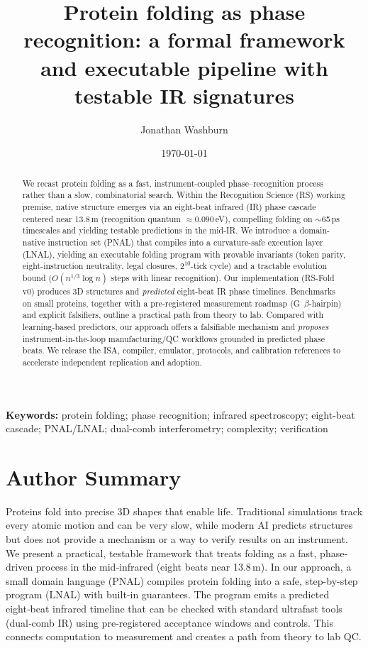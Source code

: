 \documentclass[12pt,a4paper]{article}
\title{Protein folding as phase recognition: a formal framework and executable pipeline with testable IR signatures}
\author[1]{Jonathan Washburn}
\affil[1]{Recognition Science Institute, Austin, Texas, USA}
\date{\today}
\begin{document}
\maketitle

\begin{abstract}
We recast protein folding as a fast, instrument-coupled phase–recognition process rather than a slow, combinatorial search. Within the Recognition Science (RS) working premise, native structure emerges via an eight-beat infrared (IR) phase cascade centered near 13.8\,\textmu m (recognition quantum $\approx 0.090$\,eV), compelling folding on $\sim$65\,ps timescales and yielding testable predictions in the mid-IR. We introduce a domain-native instruction set (PNAL) that compiles into a curvature-safe execution layer (LNAL), yielding an executable folding program with provable invariants (token parity, eight-instruction neutrality, legal closures, $2^{10}$-tick cycle) and a tractable evolution bound ($O(n^{1/3}\log n)$ steps with linear recognition). Our implementation (RS-Fold v0) produces 3D structures and \emph{predicted} eight-beat IR phase timelines. Benchmarks on small proteins, together with a pre-registered measurement roadmap (G~$\beta$-hairpin) and explicit falsifiers, outline a practical path from theory to lab. Compared with learning-based predictors, our approach offers a falsifiable mechanism and \emph{proposes} instrument-in-the-loop manufacturing/QC workflows grounded in predicted phase beats. We release the ISA, compiler, emulator, protocols, and calibration references to accelerate independent replication and adoption.
\end{abstract}

\noindent\textbf{Keywords:} protein folding; phase recognition; infrared spectroscopy; eight-beat cascade; PNAL/LNAL; dual-comb interferometry; complexity; verification

\section*{Author Summary}
Proteins fold into precise 3D shapes that enable life. Traditional simulations track every atomic motion and can be very slow, while modern AI predicts structures but does not provide a mechanism or a way to verify results on an instrument. We present a practical, testable framework that treats folding as a fast, phase-driven process in the mid‑infrared (eight beats near 13.8\,\textmu m). In our approach, a small domain language (PNAL) compiles protein folding into a safe, step-by-step program (LNAL) with built‑in guarantees. The program emits a predicted eight‑beat infrared timeline that can be checked with standard ultrafast tools (dual‑comb IR) using pre‑registered acceptance windows and controls. This connects computation to measurement and creates a path from theory to lab QC.
\end{document}
